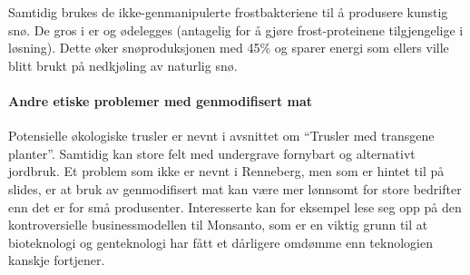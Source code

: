 
Samtidig brukes de ikke-genmanipulerte frostbakteriene til å produsere kunstig snø. De gros i er og ødelegges (antagelig for å gjøre frost-proteinene tilgjengelige i løsning). Dette øker snøproduksjonen med 45\% og sparer energi som ellers ville blitt brukt på nedkjøling av naturlig snø.

\paragraph{Andre etiske problemer med genmodifisert mat} Potensielle økologiske trusler er nevnt i avsnittet om ``Trusler med transgene planter''. Samtidig kan store felt med  undergrave fornybart og alternativt jordbruk. Et problem som ikke er nevnt i Renneberg, men som er hintet til på slides, er at bruk av genmodifisert mat kan være mer lønnsomt for store bedrifter enn det er for små produsenter. Interesserte kan for eksempel lese seg opp på den kontroversielle businessmodellen til Monsanto, som er en viktig grunn til at bioteknologi og genteknologi har fått et dårligere omdømme enn teknologien kanskje fortjener.

